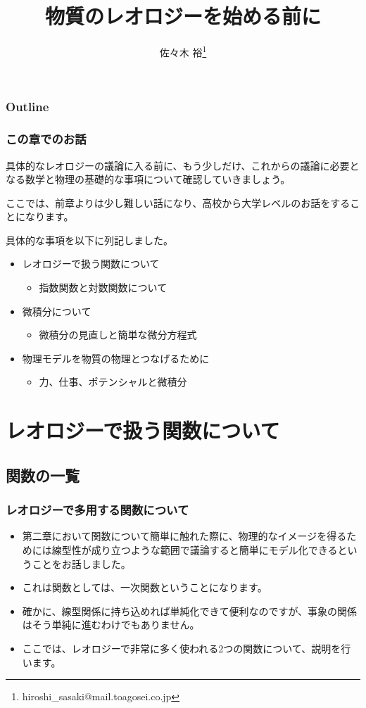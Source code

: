 \documentclass[12pt, dvipdfmx]{beamer}
\title
[物質のレオロジーを始める前に]
{物質のレオロジーを始める前に}
\author[東亞合成　佐々木]{佐々木 裕\thanks{hiroshi\_sasaki@mail.toagosei.co.jp}}
\institute[東亞合成]{東亞合成株式会社}
\date{}
\begin{document}
\maketitle

\begin{frame}
\frametitle{Outline}
\tableofcontents
\end{frame}

\begin{frame}
	\frametitle{この章でのお話}
	具体的なレオロジーの議論に入る前に、もう少しだけ、これからの議論に必要となる数学と物理の基礎的な事項について確認していきましょう。
	
	ここでは、前章よりは少し難しい話になり、高校から大学レベルのお話をすることになります。
	
	具体的な事項を以下に列記しました。
	\begin{itemize}
		\item レオロジーで扱う関数について
		\begin{itemize}
			\item 指数関数と対数関数について
		\end{itemize} 
		\item 微積分について
		\begin{itemize}
			\item 微積分の見直しと簡単な微分方程式
		\end{itemize} 
		\item 物理モデルを物質の物理とつなげるために
		\begin{itemize}
			\item 力、仕事、ポテンシャルと微積分
		\end{itemize} 
	\end{itemize}
\end{frame}

\section{レオロジーで扱う関数について}
\subsection{関数の一覧}
\begin{frame}
	\frametitle{レオロジーで多用する関数について}
	\begin{itemize}
		\item 第二章において関数について簡単に触れた際に、物理的なイメージを得るためには線型性が成り立つような範囲で議論すると簡単にモデル化できるということをお話しました。
		\item これは関数としては、一次関数ということになります。
		\item 確かに、線型関係に持ち込めれば単純化できて便利なのですが、事象の関係はそう単純に進むわけでもありません。
		\item ここでは、レオロジーで非常に多く使われる2つの関数について、説明を行います。
	\end{itemize}
	
\end{frame}
\end{document}
